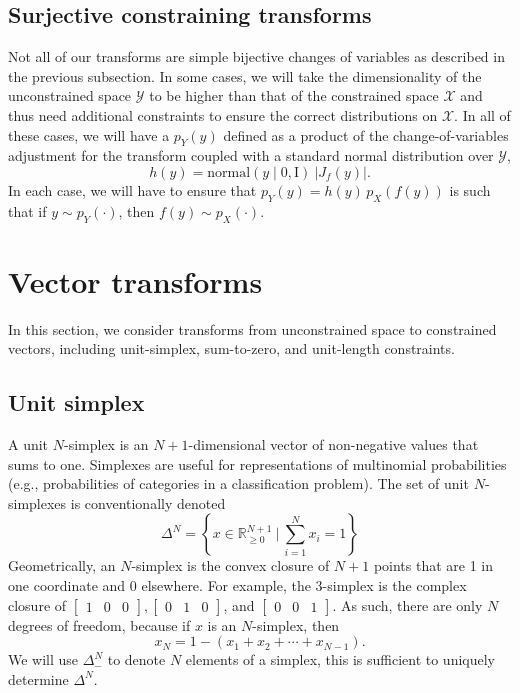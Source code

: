 \documentclass[11pt]{article}
\newcommand{\setcomp}[2]{\left\{ #1 \ \Big|\ #2 \right\}}
\newcommand{\abs}[1]{\left| #1 \right|}
\newcommand{\absdet}[1]{\abs{#1}}
\begin{document}
\subsection{Surjective constraining transforms}

Not all of our transforms are simple bijective changes of variables as described in the previous subsection.  In some cases, we will take the dimensionality of the unconstrained space $\mathcal{Y}$ to be higher than that of the constrained space $\mathcal{X}$ and thus need additional constraints to ensure the correct distributions on $\mathcal{X}$.  In all of these cases, we will have a $p_Y(y)$ defined as a product of the change-of-variables adjustment for the transform coupled with a standard normal distribution over $\mathcal{Y}$,
\[
  h(y) = \textrm{normal}(y \mid 0, \textrm{I}) \ \absdet{J_f(y)}.
\]  
In each case, we will have to ensure that $p_Y(y) = h(y) \, p_X(f(y))$ is such that if $y \sim p_Y(\cdot)$, then $f(y) \sim p_X(\cdot)$.




\section{Vector transforms}

In this section, we consider transforms from unconstrained space to constrained vectors, including unit-simplex, sum-to-zero, and unit-length constraints.

\subsection{Unit simplex}

A unit $N$-simplex is an $N + 1$-dimensional vector of non-negative
values that sums to one.  Simplexes are useful for representations of multinomial probabilities
(e.g., probabilities of categories in a classification problem). The set of unit $N$-simplexes is conventionally denoted
\[
  \Delta^N = \setcomp{x \in \mathbb{R}_{\ge 0}^{N + 1}}{ \sum_{i=1}^{N} x_i = 1}
\]
Geometrically, an $N$-simplex is the convex closure of $N+1$ points
that are 1 in one coordinate and 0 elsewhere.  For example, the
3-simplex is the complex closure of
$\begin{bmatrix}1 & 0 & 0 \end{bmatrix},
\begin{bmatrix} 0 & 1 & 0 \end{bmatrix}$,
and $\begin{bmatrix} 0 & 0 & 1 \end{bmatrix}$. As such, there are only $N$ degrees of
freedom, because if $x$ is an $N$-simplex, then
\[
  x_N = 1 - (x_1 + x_2 + \cdots + x_{N-1}).
\]
We will use $\Delta^N_-$ to denote $N$ elements of a simplex, this is sufficient to uniquely determine $\Delta^N$.
\end{document}
